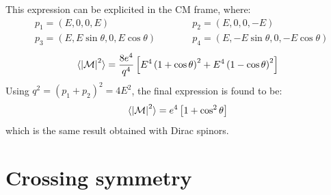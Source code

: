 This expression can be explicited in the CM frame, where:
\begin{align*}
  & p_1 = (E, 0, 0, E)
  \qquad \qquad
  & p_2 = (E, 0, 0, -E)
  \\
  & p_3 = (E, E \sin \theta, 0, E \cos \theta)
  \qquad \quad
  & p_4 = (E, -E \sin \theta, 0, -E \cos \theta)
\end{align*}
\begin{equation*}
  \braket{\left\lvert\mathcal{M}\right\rvert^2} = \frac{8e^4}{q^4} \left[ E^4 \left( 1 + \cos \theta \right)^2 + E^4 \left( 1 - \cos \theta \right)^2 \right]
\end{equation*}
Using $ q^2 = (p_1 + p_2)^2 = 4E^2 $, the final expression is found to be:
\begin{equation}
  \braket{\left\lvert\mathcal{M}\right\rvert^2} = e^4 \left[ 1 + \cos^2 \theta \right]
\end{equation}
which is the same result obtained with Dirac spinors.

\section{Crossing symmetry}

